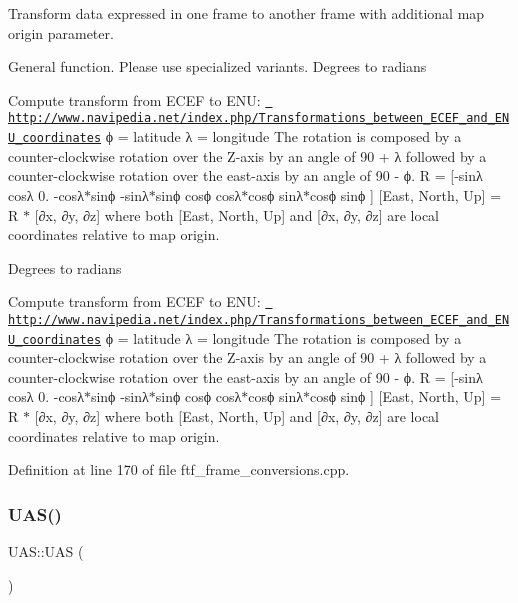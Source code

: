 Transform data expressed in one frame to another frame with additional map origin parameter. 

General function. Please use specialized variants. Degrees to radians

Compute transform from E\+C\+EF to E\+NU\+: \href{http://www.navipedia.net/index.php/Transformations_between_ECEF_and_ENU_coordinates}{\texttt{ http\+://www.\+navipedia.\+net/index.\+php/\+Transformations\+\_\+between\+\_\+\+E\+C\+E\+F\+\_\+and\+\_\+\+E\+N\+U\+\_\+coordinates}} ϕ = latitude λ = longitude The rotation is composed by a counter-\/clockwise rotation over the Z-\/axis by an angle of 90 + λ followed by a counter-\/clockwise rotation over the east-\/axis by an angle of 90 -\/ ϕ. R = \mbox{[}-\/sinλ cosλ 0. -\/cosλ$\ast$sinϕ -\/sinλ$\ast$sinϕ cosϕ cosλ$\ast$cosϕ sinλ$\ast$cosϕ sinϕ \mbox{]} \mbox{[}East, North, Up\mbox{]} = R $\ast$ \mbox{[}∂x, ∂y, ∂z\mbox{]} where both \mbox{[}East, North, Up\mbox{]} and \mbox{[}∂x, ∂y, ∂z\mbox{]} are local coordinates relative to map origin.

Degrees to radians

Compute transform from E\+C\+EF to E\+NU\+: \href{http://www.navipedia.net/index.php/Transformations_between_ECEF_and_ENU_coordinates}{\texttt{ http\+://www.\+navipedia.\+net/index.\+php/\+Transformations\+\_\+between\+\_\+\+E\+C\+E\+F\+\_\+and\+\_\+\+E\+N\+U\+\_\+coordinates}} ϕ = latitude λ = longitude The rotation is composed by a counter-\/clockwise rotation over the Z-\/axis by an angle of 90 + λ followed by a counter-\/clockwise rotation over the east-\/axis by an angle of 90 -\/ ϕ. R = \mbox{[}-\/sinλ cosλ 0. -\/cosλ$\ast$sinϕ -\/sinλ$\ast$sinϕ cosϕ cosλ$\ast$cosϕ sinλ$\ast$cosϕ sinϕ \mbox{]} \mbox{[}East, North, Up\mbox{]} = R $\ast$ \mbox{[}∂x, ∂y, ∂z\mbox{]} where both \mbox{[}East, North, Up\mbox{]} and \mbox{[}∂x, ∂y, ∂z\mbox{]} are local coordinates relative to map origin.

Definition at line 170 of file ftf\+\_\+frame\+\_\+conversions.\+cpp.

\mbox{\label{group__nodelib_ga73bb173cfb9914f380671cb0f3efb113}} 
\subsubsection{\texorpdfstring{UAS()}{UAS()}}
{\footnotesize\ttfamily U\+A\+S\+::\+U\+AS (\begin{DoxyParamCaption}{ }\end{DoxyParamCaption})}



